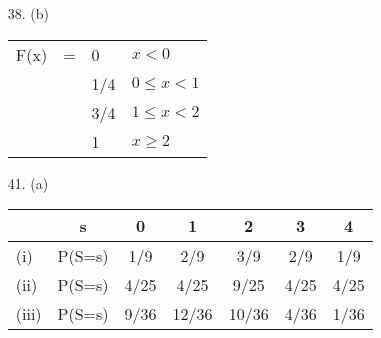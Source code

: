 \begin{itemize}
\item[38.]  (b)  \begin{tabular}[t]{rcll}
               F(x)& = &  0 &    $x < 0$ \\
                   &   & 1/4&    $0 \leq x < 1$\\
                   &   & 3/4&    $1 \leq x < 2$\\
                   &   &  1 &    $ x \geq 2$
               \end{tabular}
\item[41.]  (a)  \begin{tabular}[t]{lc|ccccc}
          &  s &  0 & 1 & 2 &  3 & 4    \\ \hline
(i) & P(S=s) &1/9&2/9&3/9&2/9&1/9  \\
(ii)& P(S=s) &4/25&4/25&9/25&4/25&4/25  \\
(iii)&P(S=s) &9/36&12/36&10/36&4/36&1/36
         \end{tabular}
\end{itemize}

